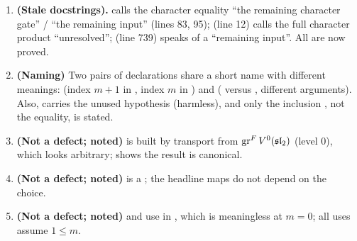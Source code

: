\begin{enumerate}
  intermediate $S_m$.
\item \textbf{(Stale docstrings).}  calls the character equality ``the
  remaining character gate'' / ``the remaining input'' (lines 83, 95); 
  (line 12) calls the full character product ``unresolved'';  (line 739)
  speaks of a ``remaining input''. All are now proved.
\item \textbf{(Naming)} Two pairs of declarations share a short name with different meanings:
   (index $m+1$ in , index $m$ in
  ) and  ( versus
  , different arguments). Also,  carries the unused
  hypothesis  (harmless), and only the inclusion , not the equality, is stated.
\item \textbf{(Not a defect; noted)}  is built by transport from $\operatorname{gr}^F V^0(\mathfrak{sl}_2)$ (level $0$),
  which looks arbitrary;  shows the result is canonical.
\item \textbf{(Not a defect; noted)}  is a ; the headline maps do not depend
  on the choice.
\item \textbf{(Not a defect; noted)}  and  use  in , which
  is meaningless at $m=0$; all uses assume $1\le m$.
\end{enumerate}

